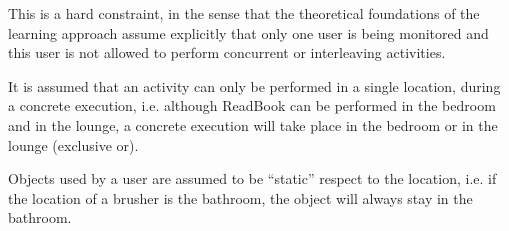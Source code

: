 \begin{cons}
\label{cons-single}
 This is a hard constraint, in the sense that the theoretical foundations of the learning approach assume explicitly that only one user is being monitored and this user is not allowed to perform concurrent or interleaving activities.
\end{cons}

\begin{cons}
\label{cons-location}
 It is assumed that an activity can only be performed in a single location, during a concrete execution, i.e. although ReadBook can be performed in the bedroom and in the lounge, a concrete execution will take place in the bedroom or in the lounge (exclusive or).
\end{cons}

\begin{cons}
\label{cons-static-obj}
 Objects used by a user are assumed to be ``static'' respect to the location, i.e. if the location of a brusher is the bathroom, the object will always stay in the bathroom.
\end{cons}